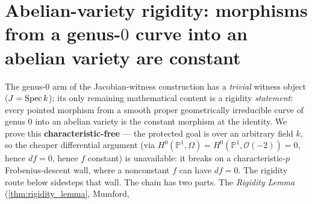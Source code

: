 \chapter{Abelian-variety rigidity: morphisms from a genus-\(0\) curve into an abelian variety are constant}
\label{chap:AbelianVarietyRigidity}
\label{chap:avr_for_rr}
\providecommand{\fatsemi}{\mathbin{\,;\,}}
The genus-\(0\) arm of the Jacobian-witness construction has a \emph{trivial} witness object
(\(J = \operatorname{Spec} k\)); its only remaining mathematical content is a rigidity \emph{statement}:
every pointed morphism from a smooth proper geometrically irreducible curve of genus \(0\)
into an abelian variety is the constant morphism at the identity. We prove this
\textbf{characteristic-free} --- the protected goal is over an arbitrary field \(k\), so the
cheaper differential argument (via \(H^0(\mathbb P^1, \Omega) = H^0(\mathbb P^1, \mathcal
O(-2)) = 0\), hence \(df = 0\), hence \(f\) constant) is unavailable: it breaks on a
characteristic-\(p\) Frobenius-descent wall, where a nonconstant \(f\) can have \(df = 0\). The
rigidity route below sidesteps that wall.
The chain has two parts. The \emph{Rigidity Lemma} (\cref{thm:rigidity_lemma}, Mumford,
